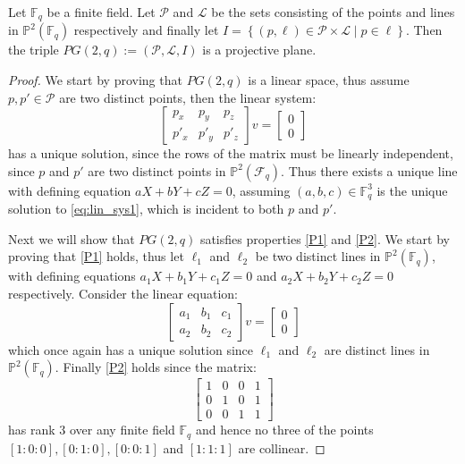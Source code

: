 \begin{theorem}\label{thm:proj_is_proj}
	Let $\mathbb{F}_q$ be a finite field. Let $\mathcal{P}$ and $\mathcal{L}$ be the sets consisting of the points and lines in $\mathbb{P}^{2}(\mathbb{F}_q)$ respectively and finally let $I = \left\{(p, \ell) \in \mathcal{P}\times \mathcal{L} \middle| p \in \ell\right\}$. Then the triple $PG(2, q) := (\mathcal{P}, \mathcal{L}, I)$ is a projective plane.
\end{theorem}
\begin{proof}
	We start by proving that $PG(2, q)$ is a linear space, thus assume $p, p' \in \mathcal{P}$ are two distinct points, then the linear system:
	\begin{equation}\label{eq:lin_sys1}
		\begin{bmatrix}
			p_x  & p_y  & p_z  \\
			p'_x & p'_y & p'_z
		\end{bmatrix}
		v= \begin{bmatrix} 0 \\ 0 \end{bmatrix}
	\end{equation}
	has a unique solution, since the rows of the matrix must be linearly independent, since $p$ and $p'$ are two distinct points in $\mathbb{P}^2(\mathcal{F}_q)$. Thus there exists a unique line with defining equation $aX + bY + cZ = 0$, assuming $(a, b, c) \in \mathbb{F}_q^3$ is the unique solution to \eqref{eq:lin_sys1}, which is incident to both $p$ and $p'$.

	Next we will show that $PG(2, q)$ satisfies properties \ref{P1} and \ref{P2}. We start by proving that \ref{P1} holds, thus let $\ell_1$ and $\ell_2$ be two distinct lines in $\mathbb{P}^2(\mathbb{F}_q)$, with defining equations $a_1 X + b_1 Y + c_1 Z = 0$ and $a_2 X + b_2 Y + c_2 Z = 0$ respectively. Consider the linear equation:
	\begin{equation*}
		\begin{bmatrix}
			a_1 & b_1 & c_1 \\
			a_2 & b_2 & c_2
		\end{bmatrix}
		v = \begin{bmatrix} 0 \\ 0 \end{bmatrix}
	\end{equation*}
	which once again has a unique solution since $\ell_1$ and $\ell_2$ are distinct lines in $\mathbb{P}^2(\mathbb{F}_{q})$.
	Finally \ref{P2} holds since the matrix:
	\begin{equation*}
		\begin{bmatrix} 1 & 0 & 0 & 1 \\ 0 & 1 & 0 & 1 \\ 0 & 0 & 1 & 1\end{bmatrix}
	\end{equation*}
	has rank $3$ over any finite field $\mathbb{F}_q$ and hence no three of the points $[1: 0: 0], [0: 1: 0], [0: 0: 1]$ and $[1: 1: 1]$ are collinear.
\end{proof}
